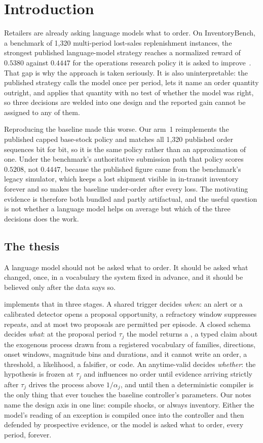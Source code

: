 \section{Introduction}

Retailers are already asking language models what to order. On InventoryBench, a
benchmark of 1{,}320 multi-period lost-sales replenishment instances, the
strongest published language-model strategy reaches a normalized reward of
$0.5380$ against $0.4447$ for the operations research policy it is asked to
improve~\cite{inventorybench}. That gap is why the approach is taken seriously.
It is also uninterpretable: the published strategy calls the model once per
period, lets it name an order quantity outright, and applies that quantity with
no test of whether the model was right, so three decisions are welded into one
design and the reported gain cannot be assigned to any of them.

Reproducing the baseline made this worse. Our arm~1 reimplements the published
capped base-stock policy and matches all 1{,}320 published order sequences bit
for bit, so it is the same policy rather than an approximation of one. Under the
benchmark's authoritative submission path that policy scores $0.5208$, not
$0.4447$, because the published figure came from the benchmark's legacy
simulator, which keeps a lost shipment visible in in-transit inventory forever
and so makes the baseline under-order after every loss. The motivating evidence
is therefore both bundled and partly artifactual, and the useful question is not
whether a language model helps on average but which of the three decisions does
the work.

\subsection*{The thesis}

A language model should not be asked what to order. It should be asked what
changed, once, in a vocabulary the system fixed in advance, and it should be
believed only after the data says so.

\collie{} implements that in three stages. A shared trigger decides \emph{when}:
an alert or a calibrated detector opens a proposal opportunity, a refractory
window suppresses repeats, and at most two proposals are permitted per episode. A
closed schema decides \emph{what}: at the proposal period $\tau_j$ the model
returns a \shockspec{}, a typed claim about the exogenous process drawn from a
registered vocabulary of families, directions, onset windows, magnitude bins and
durations, and it cannot write an order, a threshold, a likelihood, a falsifier,
or code. An anytime-valid \eprocess{} decides \emph{whether}: the hypothesis is
frozen at $\tau_j$ and influences no order until evidence arriving strictly after
$\tau_j$ drives the process above $1/\alpha_j$, and until then a deterministic
compiler is the only thing that ever touches the baseline controller's
parameters. Our notes name the design axis in one line: compile shocks, or always
inventory. Either the model's reading of an exception is compiled once into the
controller and then defended by prospective evidence, or the model is asked what
to order, every period, forever.

